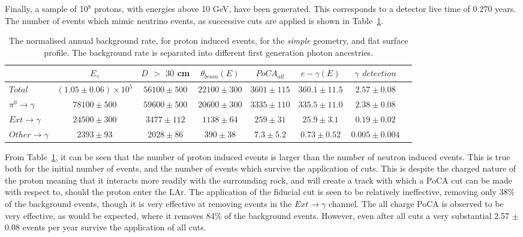Finally, a sample of 10$^{8}$ protons, with energies above 10 GeV, have been generated. This corresponds to a detector live time of 0.270 years. The number of events which mimic neutrino events, as successive cuts are applied is shown in Table~\ref{tab:SurfProSimp}. \\

\begin{table}
  \caption[The normalised annual background rate, for proton induced events, for the \emph{simple} geometry, and flat surface profile]
          {The normalised annual background rate, for proton induced events, for the \emph{simple} geometry, and flat surface profile. The background rate is separated into different first generation photon ancestries.}
  \label{tab:SurfProSimp}
  \centering
  \scriptsize
  \begin{tabular}{l c c c c c c c }
    \toprule
        & $E_\gamma$ &  $D$ $>$ $30$ cm & $\theta_{beam}(E)$ & $PoCA_{all}$ & $e-\gamma(E)$ & $\gamma$ $detection$ \\
        \midrule
        $Total$          & $(1.05\pm0.06)\times10^{5}$ & $56100\pm500$ & $22100\pm300$ & $3601\pm115$ & $360.1\pm11.5$ & $2.57\pm0.08$ \\

        $\pi^0\to\gamma$ & $78100\pm500$               & $59600\pm500$ & $20600\pm300$ & $3335\pm110$ & $335.5\pm11.0$ & $2.38\pm0.08$ \\

        $Ext\to\gamma$   & $24500\pm300$               & $3477\pm112$  & $1138\pm64$   & $259\pm31$   & $25.9\pm3.1$   & $0.19\pm0.02$ \\

        $Other\to\gamma$ & $2393\pm93$                 & $2028\pm86$   & $390\pm38$    & $7.3\pm5.2$  & $0.73\pm0.52$  & $0.005\pm0.004$ \\
        \bottomrule
  \end{tabular}
\end{table}

From Table~\ref{tab:SurfProSimp}, it can be seen that the number of proton induced events is larger than the number of neutron induced events. This is true both for the initial number of events, and the number of events which survive the application of cuts. This is despite the charged nature of the proton meaning that it interacts more readily with the surrounding rock, and will create a track with which a PoCA cut can be made with respect to, should the proton enter the LAr. The application of the fiducial cut is seen to be relatively ineffective, removing only 38\% of the background events, though it is very effective at removing events in the $Ext\to\gamma$ channel. The all charge PoCA is observed to be very effective, as would be expected, where it removes 84\% of the background events. However, even after all cuts a very substantial 2.57 $\pm$ 0.08 events per year survive the application of all cuts. \\

